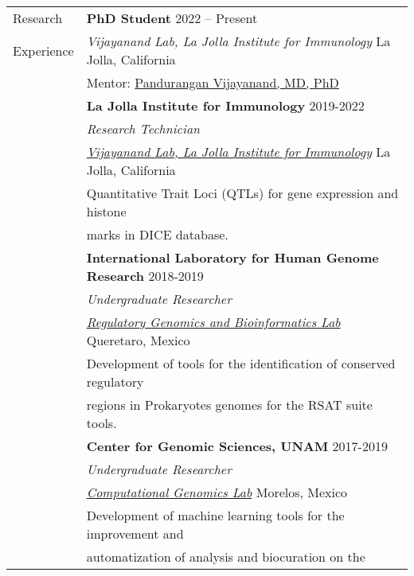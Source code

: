 \documentclass[letterpaper, 11pt]{article}
\begin{document}
\begin{longtable}{@{}p{1.1in}p{6.05in}}

{\sc Research} &
\textbf{PhD Student} \hfill 2022 -- Present   \\
{\sc Experience} & \textit{Vijayanand Lab, La Jolla Institute for Immunology} \hfill La Jolla, California \\
& Mentor: \href{https://www.lji.org/labs/vijayanand/}{Pandurangan Vijayanand, MD, PhD} \\
&\textbf{La Jolla Institute for Immunology} \hfill 2019-2022\\
& \textit{Research Technician}\\
& \href{https://www.lji.org/labs/vijayanand/}{\textit{Vijayanand Lab, La Jolla Institute for Immunology}} \hfill La 
Jolla, California \\
& Quantitative Trait Loci (QTLs) for gene expression and histone \\ & marks in DICE database.  \\
&\textbf{International Laboratory for Human Genome Research} \hfill 2018-2019\\
& \textit{Undergraduate Researcher}\\
& \href{https://liigh.unam.mx/amedina/}{\textit{Regulatory Genomics and Bioinformatics Lab}} \hfill Queretaro, Mexico \\
& Development of tools for the identification of conserved regulatory \\ & regions in Prokaryotes genomes for the RSAT 
suite tools. \\
&\textbf{Center for Genomic Sciences, UNAM} \hfill 2017-2019\\
& \textit{Undergraduate Researcher}\\
& \href{https://www.ccg.unam.mx/en/computational-genomics/}{\textit{Computational Genomics Lab}} \hfill Morelos, Mexico 
\\
& Development of machine learning tools for the improvement and \\ & automatization of analysis and biocuration on the 

\end{longtable}
\end{document}

